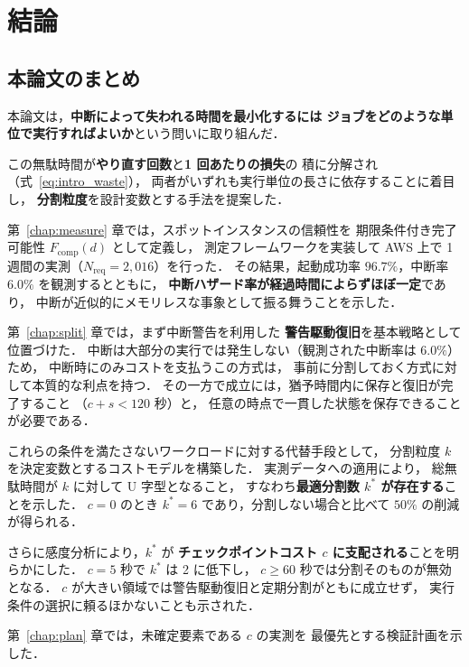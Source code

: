\documentclass[11pt,a4paper]{ltjsreport}
\newcommand{\Fcomp}{F_{\mathrm{comp}}}
\newcommand{\Nreq}{N_{\mathrm{req}}}
\begin{document}
\chapter{結論}
\label{chap:conclusion}

\section{本論文のまとめ}

本論文は，\textbf{中断によって失われる時間を最小化するには
ジョブをどのような単位で実行すればよいか}という問いに取り組んだ．

この無駄時間が\textbf{やり直す回数}と\textbf{1 回あたりの損失}の
積に分解され（式~\eqref{eq:intro_waste}），
両者がいずれも実行単位の長さに依存することに着目し，
\textbf{分割粒度}を設計変数とする手法を提案した．

第~\ref{chap:measure} 章では，スポットインスタンスの信頼性を
期限条件付き完了可能性 $\Fcomp(d)$ として定義し，
測定フレームワークを実装して
AWS 上で 1 週間の実測（$\Nreq = 2{,}016$）を行った．
その結果，起動成功率 $96.7\%$，中断率 $6.0\%$ を観測するとともに，
\textbf{中断ハザード率が経過時間によらずほぼ一定}であり，
中断が近似的にメモリレスな事象として振る舞うことを示した．

第~\ref{chap:split} 章では，まず中断警告を利用した
\textbf{警告駆動復旧}を基本戦略として位置づけた．
中断は大部分の実行では発生しない（観測された中断率は $6.0\%$）ため，
中断時にのみコストを支払うこの方式は，
事前に分割しておく方式に対して本質的な利点を持つ．
その一方で成立には，猶予時間内に保存と復旧が完了すること
（$c + s < 120$ 秒）と，
任意の時点で一貫した状態を保存できることが必要である．

これらの条件を満たさないワークロードに対する代替手段として，
分割粒度 $k$ を決定変数とするコストモデルを構築した．
実測データへの適用により，
総無駄時間が $k$ に対して U 字型となること，
すなわち\textbf{最適分割数 $k^{*}$ が存在する}ことを示した．
$c = 0$ のとき $k^{*} = 6$ であり，分割しない場合と比べて
$50\%$ の削減が得られる．

さらに感度分析により，$k^{*}$ が
\textbf{チェックポイントコスト $c$ に支配される}ことを明らかにした．
$c = 5$ 秒で $k^{*}$ は 2 に低下し，
$c \geq 60$ 秒では分割そのものが無効となる．
$c$ が大きい領域では警告駆動復旧と定期分割がともに成立せず，
実行条件の選択に頼るほかないことも示された．

第~\ref{chap:plan} 章では，未確定要素である $c$ の実測を
最優先とする検証計画を示した．
\end{document}
